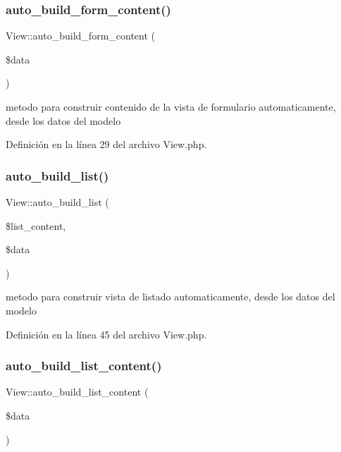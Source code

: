 \subsubsection{\texorpdfstring{auto\_build\_form\_content()}{auto\_build\_form\_content()}}
{\footnotesize\ttfamily View\+::auto\+\_\+build\+\_\+form\+\_\+content (\begin{DoxyParamCaption}\item[{}]{\$data }\end{DoxyParamCaption})}

metodo para construir contenido de la vista de formulario automaticamente, desde los datos del modelo 

Definición en la línea 29 del archivo View.\+php.

\mbox{\label{class_view_afff2bf095f5152f4b9074da8c656581f}} 
\subsubsection{\texorpdfstring{auto\_build\_list()}{auto\_build\_list()}}
{\footnotesize\ttfamily View\+::auto\+\_\+build\+\_\+list (\begin{DoxyParamCaption}\item[{}]{\$list\+\_\+content,  }\item[{}]{\$data }\end{DoxyParamCaption})}

metodo para construir vista de listado automaticamente, desde los datos del modelo 

Definición en la línea 45 del archivo View.\+php.

\mbox{\label{class_view_a74d1701b5981346a27394c9b7002cb06}} 
\subsubsection{\texorpdfstring{auto\_build\_list\_content()}{auto\_build\_list\_content()}}
{\footnotesize\ttfamily View\+::auto\+\_\+build\+\_\+list\+\_\+content (\begin{DoxyParamCaption}\item[{}]{\$data }\end{DoxyParamCaption})}

